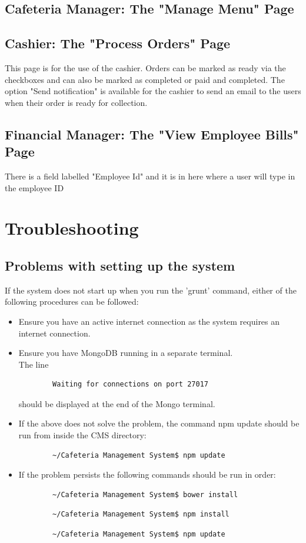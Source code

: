 \documentclass[a4paper,12pt]{article}
\begin{document}
\subsection{Cafeteria Manager: The "Manage Menu" Page}

\subsection{Cashier: The "Process Orders" Page}
This page is for the use of the cashier. Orders can be marked as ready via the checkboxes and can also be marked as completed or paid and completed. The option "Send notification" is available for the cashier to send an email to the users when their order is ready for collection.

\subsection{Financial Manager: The "View Employee Bills" Page}
There is a field labelled "Employee Id" and it is in here where a user will type in the employee ID 

\section{Troubleshooting}
\subsection{Problems with setting up the system}
If the system does not start up when you run the 'grunt' command, either of the following procedures can be followed:
\begin{itemize}
\item Ensure you have an active internet connection as the system requires an internet connection.
\item Ensure you have MongoDB running in a separate terminal. \\
	The line \begin{verbatim}
		Waiting for connections on port 27017
	\end{verbatim} should be displayed at the end of the Mongo terminal.
\item If the above does not solve the problem, the command npm update should be run from inside the CMS directory:
	\begin{verbatim}
		~/Cafeteria Management System$ npm update
	\end{verbatim}
\item If the problem persists the following commands should be run in order:
	\begin{verbatim}
		~/Cafeteria Management System$ bower install
	\end{verbatim} 
	\begin{verbatim}
		~/Cafeteria Management System$ npm install
	\end{verbatim} 
	\begin{verbatim}
		~/Cafeteria Management System$ npm update
	\end{verbatim}
\end{itemize}
\end{document}
